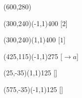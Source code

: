 \documentclass[12pt]{article}
\begin{document}
\begin{figure}[htb]
\hspace*{\fill}
\begin{egame}(600,280)

\renewcommand{\egarrowstyle}{}

\putbranch(300,240)(-1,1){400}
[$2$]

\renewcommand{\egarrowstyle}{}

\putbranch(300,240)(1,1){400}
[$1$]







\renewcommand{\egarrowstyle}{}

\putbranch(425,115)(-1,1){275}
\ib{}{}[$\rightarrow a$] 

\renewcommand{\egarrowstyle}{}

\putbranch(25,-35)(1,1){125}
[]  

\renewcommand{\egarrowstyle}{}

\putbranch(575,-35)(-1,1){125}
\ib{}{}[] 


\end{egame}
\end{figure}
\end{document}
